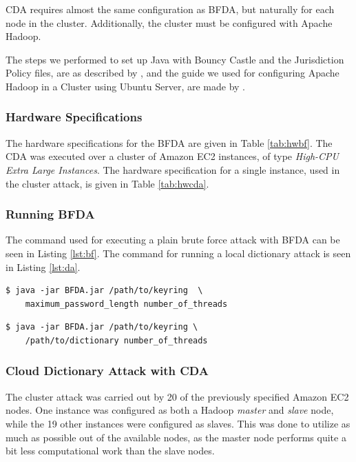 \documentclass[pdftex,english,10pt,b5paper,twoside]{book}
\begin{document}
\ac{CDA} requires almost the same configuration as \ac{BFDA}, but naturally for
each node in the cluster. Additionally, the cluster must be configured with
Apache Hadoop.

The steps we performed to set up Java with Bouncy Castle and the Jurisdiction
Policy files, are as described by \citet{jce+bc}, and the guide we used for
configuring Apache Hadoop in a Cluster using Ubuntu Server, are made by
\citet{cluster}.

\subsubsection{Hardware Specifications}

The hardware specifications for the \acl{BFDA} are given in Table
\ref{tab:hwbf}. The \acl{CDA} was executed over a cluster of Amazon \ac{EC2}
instances, of type \emph{High-CPU Extra Large Instances}. The hardware
specification for a single instance, used in the cluster attack, is given in
Table \ref{tab:hwcda}.




\subsubsection{Running \ac{BFDA}}

The command used for executing a plain brute force attack with \ac{BFDA} can be
seen in Listing \ref{lst:bf}. The command for running a local dictionary attack
is seen in Listing \ref{lst:da}.

\lstset{label=lst:bf, caption=Running local brute force attack}
\begin{lstlisting}
$ java -jar BFDA.jar /path/to/keyring  \
    maximum_password_length number_of_threads
\end{lstlisting}

\lstset{label=lst:da, caption=Running local dictionary attack}
\begin{lstlisting}
$ java -jar BFDA.jar /path/to/keyring \
    /path/to/dictionary number_of_threads
\end{lstlisting}

\subsubsection{Cloud Dictionary Attack with \ac{CDA}}

The cluster attack was carried out by 20 of the previously specified Amazon EC2
nodes. One instance was configured as both a Hadoop \emph{master} and
\emph{slave} node, while the 19 other instances were configured as slaves.
This was done to utilize as much as possible out of the available nodes, as the
master node performs quite a bit less computational work than the slave nodes.
\end{document}

